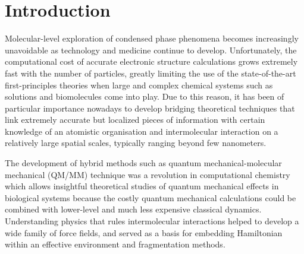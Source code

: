 \documentclass[aip,amsmath,amssymb,reprint,floatfix]{revtex4-1}
\begin{document}
\section{\label{s:1}Introduction}

Molecular\hyp{}level exploration of condensed phase phenomena becomes increasingly unavoidable
as technology and medicine continue to develop. Unfortunately, the computational cost of accurate
electronic structure calculations grows extremely fast with the number of particles, greatly limiting
the use of the state\hyp{}of\hyp{}the\hyp{}art first\hyp{}principles theories 
when large and complex chemical systems such as
solutions and biomolecules come into play.\cite{Tomasi.Mennucci.Cammi.ChemRev.2005}
Due to this reason, it has been of particular importance nowadays 
to develop bridging theoretical techniques that link
extremely accurate but localized pieces of information 
with certain knowledge of an atomistic organisation and intermolecular interaction
on a relatively large spatial scales, typically ranging beyond few nanometers. 

The development of hybrid methods such as quantum mechanical\hyp{}molecular mechanical (QM/MM)
technique was a revolution in computational chemistry which allows insightful theoretical studies
of quantum mechanical effects in biological systems because the costly quantum mechanical calculations
could be combined with lower\hyp{}level and much less expensive
classical dynamics.\cite{Warshel.Levitt.JMolBiol.1976,Senn.Thiel.Angew.2009}
Understanding physics that rules intermolecular interactions\cite{Jeziorski.Moszynski.Szalewicz.ChemRev.1994} 
helped to develop
a wide family of force fields, and served as a basis for embedding Hamiltonian
within an effective environment and fragmentation methods.\cite{Gordon.Fedorov.Pruitt.Slipchenko.ChemRev.2012}
\end{document}
